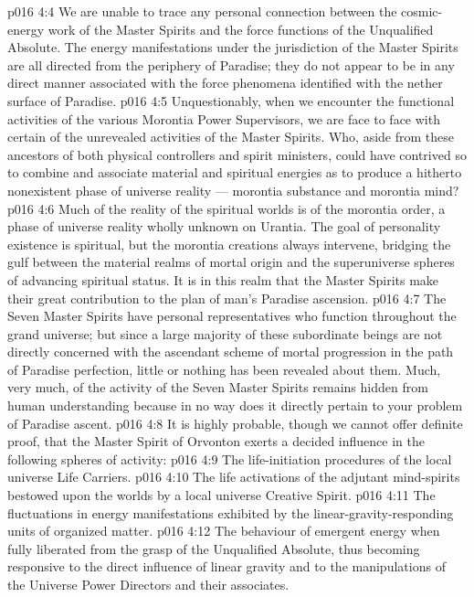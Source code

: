 \vs p016 4:4 We are unable to trace any personal connection between the cosmic\hyp{}energy work of the Master Spirits and the force functions of the Unqualified Absolute. The energy manifestations under the jurisdiction of the Master Spirits are all directed from the periphery of Paradise; they do not appear to be in any direct manner associated with the force phenomena identified with the nether surface of Paradise.
\vs p016 4:5 Unquestionably, when we encounter the functional activities of the various Morontia Power Supervisors, we are face to face with certain of the unrevealed activities of the Master Spirits. Who, aside from these ancestors of both physical controllers and spirit ministers, could have contrived so to combine and associate material and spiritual energies as to produce a hitherto nonexistent phase of universe reality --- morontia substance and morontia mind?
\vs p016 4:6 Much of the reality of the spiritual worlds is of the morontia order, a phase of universe reality wholly unknown on Urantia. The goal of personality existence is spiritual, but the morontia creations always intervene, bridging the gulf between the material realms of mortal origin and the superuniverse spheres of advancing spiritual status. It is in this realm that the Master Spirits make their great contribution to the plan of man’s Paradise ascension.
\vs p016 4:7 The Seven Master Spirits have personal representatives who function throughout the grand universe; but since a large majority of these subordinate beings are not directly concerned with the ascendant scheme of mortal progression in the path of Paradise perfection, little or nothing has been revealed about them. Much, very much, of the activity of the Seven Master Spirits remains hidden from human understanding because in no way does it directly pertain to your problem of Paradise ascent.
\vs p016 4:8 \pc It is highly probable, though we cannot offer definite proof, that the Master Spirit of Orvonton exerts a decided influence in the following spheres of activity:
\vs p016 4:9 \bibnobreakspace The life\hyp{}initiation procedures of the local universe Life Carriers.
\vs p016 4:10 \bibnobreakspace The life activations of the adjutant mind\hyp{}spirits bestowed upon the worlds by a local universe Creative Spirit.
\vs p016 4:11 \bibnobreakspace The fluctuations in energy manifestations exhibited by the linear\hyp{}gravity\hyp{}responding units of organized matter.
\vs p016 4:12 \bibnobreakspace The behaviour of emergent energy when fully liberated from the grasp of the Unqualified Absolute, thus becoming responsive to the direct influence of linear gravity and to the manipulations of the Universe Power Directors and their associates.

